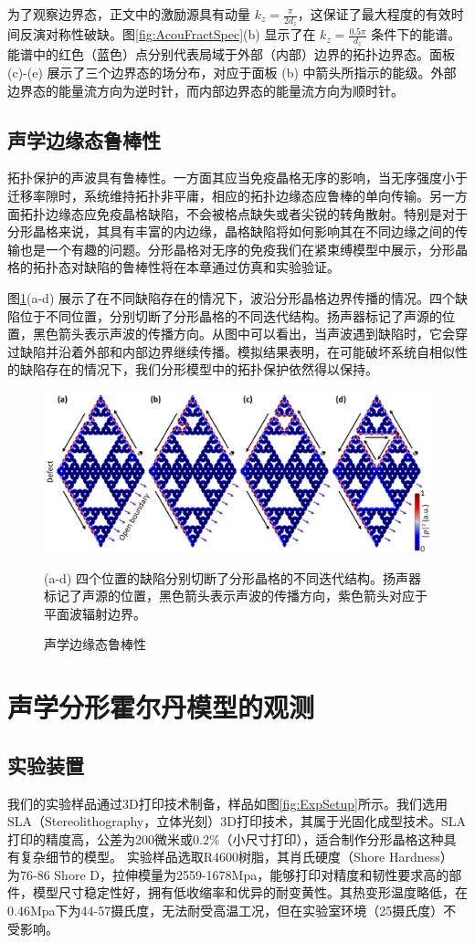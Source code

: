 为了观察边界态，正文中的激励源具有动量 $k_z = \frac{\pi}{2d_z}$，这保证了最大程度的有效时间反演对称性破缺。图\ref{fig:AcouFractSpec}(b) 显示了在 $k_z = \frac{0.5\pi}{d_z}$ 条件下的能谱。能谱中的红色（蓝色）点分别代表局域于外部（内部）边界的拓扑边界态。面板 (c)-(e) 展示了三个边界态的场分布，对应于面板 (b) 中箭头所指示的能级。外部边界态的能量流方向为逆时针，而内部边界态的能量流方向为顺时针。

\subsection{声学边缘态鲁棒性}
拓扑保护的声波具有鲁棒性。一方面其应当免疫晶格无序的影响，当无序强度小于迁移率隙时，系统维持拓扑非平庸，相应的拓扑边缘态应鲁棒的单向传输。另一方面拓扑边缘态应免疫晶格缺陷，不会被格点缺失或者尖锐的转角散射。特别是对于分形晶格来说，其具有丰富的内边缘，晶格缺陷将如何影响其在不同边缘之间的传输也是一个有趣的问题。分形晶格对无序的免疫我们在紧束缚模型中展示，分形晶格的拓扑态对缺陷的鲁棒性将在本章通过仿真和实验验证。

图\ref{fig:ComsolDefect}(a-d) 展示了在不同缺陷存在的情况下，波沿分形晶格边界传播的情况。四个缺陷位于不同位置，分别切断了分形晶格的不同迭代结构。扬声器标记了声源的位置，黑色箭头表示声波的传播方向。从图中可以看出，当声波遇到缺陷时，它会穿过缺陷并沿着外部和内部边界继续传播。模拟结果表明，在可能破坏系统自相似性的缺陷存在的情况下，我们分形模型中的拓扑保护依然得以保持。
\begin{figure}[htbp]
    \centering
    \includegraphics[width=0.75\linewidth]{figure/FracHaldExp/ComsolDefect.png}
    \caption{声学边缘态鲁棒性}(a-d) 四个位置的缺陷分别切断了分形晶格的不同迭代结构。扬声器标记了声源的位置，黑色箭头表示声波的传播方向，紫色箭头对应于平面波辐射边界。
    \label{fig:ComsolDefect}
\end{figure}
\section{声学分形霍尔丹模型的观测}
\subsection{实验装置}
我们的实验样品通过3D打印技术制备，样品如图\ref{fig:ExpSetup}所示。我们选用SLA（Stereolithography，立体光刻）3D打印技术，其属于光固化成型技术。SLA打印的精度高，公差为200微米或$0.2\%$（小尺寸打印），适合制作分形晶格这种具有复杂细节的模型。 实验样品选取R4600树脂，其肖氏硬度（Shore Hardness） 为76-86 Shore D，拉伸模量为2559-1678Mpa，能够打印对精度和韧性要求高的部件，模型尺寸稳定性好，拥有低收缩率和优异的耐变黄性。其热变形温度略低，在0.46Mpa下为44-57摄氏度，无法耐受高温工况，但在实验室环境（25摄氏度）不受影响。


